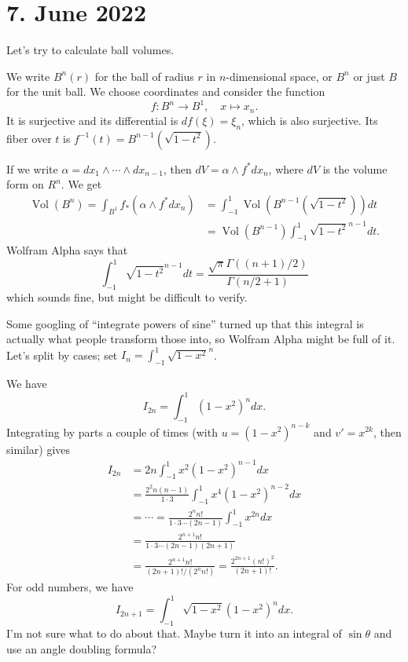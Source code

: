 \documentclass[11pt]{amsart}
\theoremstyle{definition}
\DeclareMathOperator{\Vol}{Vol}
\begin{document}
\section*{7. June 2022}

Let's try to calculate ball volumes.

We write $B^{n}(r)$ for the ball of radius $r$ in $n$-dimensional space, or $B^{n}$ or just $B$ for the unit ball. We choose coordinates and consider the function
\[
  f : B^{n} \to B^{1},\quad
  x \mapsto x_{n}.
\]
It is surjective and its differential is $df(\xi) = \xi_{n}$, which is also surjective. Its fiber over $t$ is $f^{-1}(t) = B^{n-1}(\sqrt{1-t^{2}})$.

If we write $\alpha = dx_{1} \wedge \cdots \wedge dx_{n-1}$, then $dV = \alpha \wedge f^{*} dx_{n}$, where $dV$ is the volume form on $R^{n}$. We get
\begin{align*}
  \Vol(B^{n})
  = \int_{B^{1}} f_{*}(\alpha \wedge f^{*}dx_{n})
  &= \int_{-1}^{1} \Vol(B^{n-1}(\sqrt{1-t^{2}})) dt
    \\
  &= \Vol(B^{n-1})\int_{-1}^{1}\sqrt{1-t^{2}}^{n-1} dt.
\end{align*}
Wolfram Alpha says that
$$
\int_{-1}^{1}\sqrt{1-t^{2}}^{n-1} dt
= \frac{\sqrt\pi \Gamma((n+1)/2)}{\Gamma(n/2 + 1)}
$$
which sounds fine, but might be difficult to verify.

Some googling of ``integrate powers of sine'' turned up that this integral is actually what people transform those into, so Wolfram Alpha might be full of it.
Let's split by cases; set $I_{n} = \int_{-1}^{1}\sqrt{1-x^{2}}^{n}$.

We have
$$
I_{2n} = \int_{-1}^{1}(1-x^{2})^{n} dx.
$$
Integrating by parts a couple of times (with $u = (1-x^{2})^{n-k}$ and $v' = x^{2k}$, then similar) gives
\begin{align*}
I_{2n}
&= 2n \int_{-1}^{1} x^{2} (1-x^{2})^{n-1} dx
\\
&= \frac{2^{2} n(n-1)}{1 \cdot 3} \int_{-1}^{1} x^4 (1-x^{2})^{n-2} dx
\\
&= \cdots =
\frac{2^{n} n!}{1 \cdot 3 \cdots (2n-1)} \int_{-1}^{1} x^{2n} dx
\\
&= \frac{2^{n+1} n!}{1 \cdot 3 \cdots (2n-1)(2n+1)}
\\
&= \frac{2^{n+1} n!}{(2n+1)!/(2^{n}n!)}
= \frac{2^{2n+1} (n!)^{2}}{(2n+1)!}.
\end{align*}
For odd numbers, we have
\[
I_{2n+1} = \int_{-1}^{1} \sqrt{1-x^{2}} (1-x^{2})^{n} dx.
\]
I'm not sure what to do about that. Maybe turn it into an integral of $\sin \theta$ and use an angle doubling formula?
\end{document}
